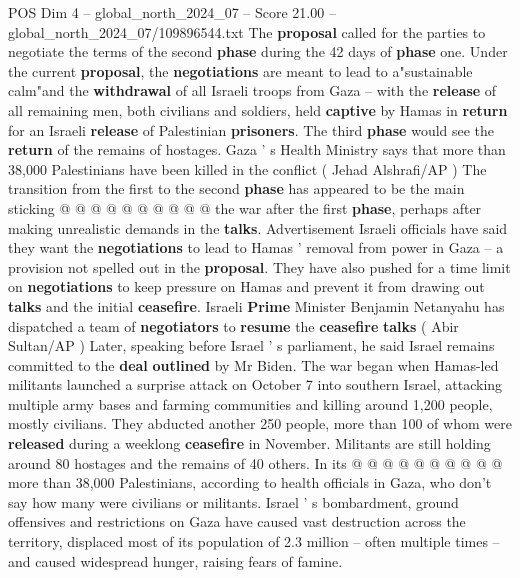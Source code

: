 \begin{textsample}{POS Dim 4 – global\_north\_2024\_07 – Score 21.00 – global\_north\_2024\_07/109896544.txt}
The \textbf{proposal} called for the parties to negotiate the terms of the second \textbf{phase} during the 42 days of \textbf{phase} one.
Under the current \textbf{proposal}, the \textbf{negotiations} are meant to lead to a"sustainable calm"and the \textbf{withdrawal} of all Israeli troops from Gaza -- with the \textbf{release} of all remaining men, both civilians and soldiers, held \textbf{captive} by Hamas in \textbf{return} for an Israeli \textbf{release} of Palestinian \textbf{prisoners}.
The third \textbf{phase} would see the \textbf{return} of the remains of hostages.
Gaza ' s Health Ministry says that more than 38,000 Palestinians have been killed in the conflict ( Jehad Alshrafi/AP ) The transition from the first to the second \textbf{phase} has appeared to be the main sticking @ @ @ @ @ @ @ @ @ @ the war after the first \textbf{phase}, perhaps after making unrealistic demands in the \textbf{talks}.
Advertisement Israeli officials have said they want the \textbf{negotiations} to lead to Hamas ' removal from power in Gaza -- a provision not spelled out in the \textbf{proposal}.
They have also pushed for a time limit on \textbf{negotiations} to keep pressure on Hamas and prevent it from drawing out \textbf{talks} and the initial \textbf{ceasefire}.
Israeli \textbf{Prime} Minister Benjamin Netanyahu has dispatched a team of \textbf{negotiators} to \textbf{resume} the \textbf{ceasefire} \textbf{talks} ( Abir Sultan/AP ) Later, speaking before Israel ' s parliament, he said Israel remains committed to the \textbf{deal} \textbf{outlined} by Mr Biden.
The war began when Hamas-led militants launched a surprise attack on October 7 into southern Israel, attacking multiple army bases and farming communities and killing around 1,200 people, mostly civilians.
They abducted another 250 people, more than 100 of whom were \textbf{released} during a weeklong \textbf{ceasefire} in November.
Militants are still holding around 80 hostages and the remains of 40 others.
In its @ @ @ @ @ @ @ @ @ @ more than 38,000 Palestinians, according to health officials in Gaza, who don't say how many were civilians or militants.
Israel ' s bombardment, ground offensives and restrictions on Gaza have caused vast destruction across the territory, displaced most of its population of 2.3 million -- often multiple times -- and caused widespread hunger, raising fears of famine.

\end{textsample}
